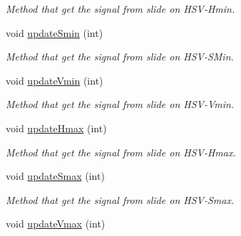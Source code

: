 \begin{DoxyCompactItemize}
\begin{DoxyCompactList}\small\item\em Method that get the signal from slide on H\+S\+V-\/\+Hmin. \end{DoxyCompactList}\item 
void \hyperlink{classMainWindow_a11f3aa0b929685232b671cd378d31972}{update\+Smin} (int)\hypertarget{classMainWindow_a11f3aa0b929685232b671cd378d31972}{}\label{classMainWindow_a11f3aa0b929685232b671cd378d31972}

\begin{DoxyCompactList}\small\item\em Method that get the signal from slide on H\+S\+V-\/\+S\+Min. \end{DoxyCompactList}\item 
void \hyperlink{classMainWindow_a43da847294670cdaaa17f2235888b47a}{update\+Vmin} (int)\hypertarget{classMainWindow_a43da847294670cdaaa17f2235888b47a}{}\label{classMainWindow_a43da847294670cdaaa17f2235888b47a}

\begin{DoxyCompactList}\small\item\em Method that get the signal from slide on H\+S\+V-\/\+Vmin. \end{DoxyCompactList}\item 
void \hyperlink{classMainWindow_af3d7639f0c28d053fdc10484b109ac99}{update\+Hmax} (int)\hypertarget{classMainWindow_af3d7639f0c28d053fdc10484b109ac99}{}\label{classMainWindow_af3d7639f0c28d053fdc10484b109ac99}

\begin{DoxyCompactList}\small\item\em Method that get the signal from slide on H\+S\+V-\/\+Hmax. \end{DoxyCompactList}\item 
void \hyperlink{classMainWindow_a2c08d2f7c55d78c30b12dd3a16905d7b}{update\+Smax} (int)\hypertarget{classMainWindow_a2c08d2f7c55d78c30b12dd3a16905d7b}{}\label{classMainWindow_a2c08d2f7c55d78c30b12dd3a16905d7b}

\begin{DoxyCompactList}\small\item\em Method that get the signal from slide on H\+S\+V-\/\+Smax. \end{DoxyCompactList}\item 
void \hyperlink{classMainWindow_a2f06abb52f3906ae6177f7fc9f859505}{update\+Vmax} (int)\hypertarget{classMainWindow_a2f06abb52f3906ae6177f7fc9f859505}{}\label{classMainWindow_a2f06abb52f3906ae6177f7fc9f859505}


\end{DoxyCompactItemize}
